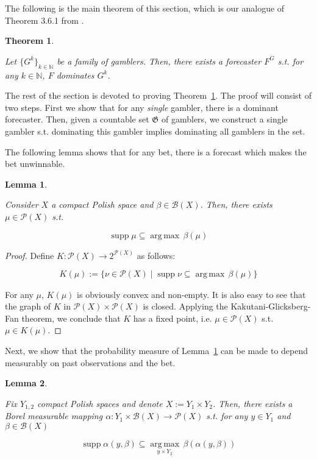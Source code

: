 \documentclass[11pt]{article}
\theoremstyle{definition}
\theoremstyle{plain}
\newtheorem{theorem}{Theorem}%
\newtheorem{lemma}{Lemma}%
\newcommand{\Nats}{\mathbb{N}}
\newcommand{\Argmax}[1]{\underset{#1}{\operatorname{arg\,max}}\,}
\newcommand{\Sq}[2]{\{#1\}_{#2 \in \Nats}}
\newcommand{\PM}{\mathcal{P}}
\DeclareMathOperator{\Sp}{supp}
\newcommand{\Gm}{\mathcal{B}}
\newcommand{\GC}{\mathfrak{G}}
\begin{document}
The following is the main theorem of this section, which is our analogue of Theorem 3.6.1 from \cite{Garrabrant_2016}.

\begin{theorem}
\label{thm:exist_dominant}

Let $\Sq{G^k}{k}$ be a family of gamblers. Then, there exists a forecaster $F^G$ s.t. for any $k \in \Nats$, $F$ dominates $G^k$.

\end{theorem}

The rest of the section is devoted to proving Theorem~\ref{thm:exist_dominant}. The proof will consist of two steps. First we show that for any \emph{single} gambler, there is a dominant forecaster. Then, given a countable set $\GC$ of gamblers, we construct a single gambler s.t. dominating this gambler implies dominating all gamblers in the set.

The following lemma shows that for any bet, there is a forecast which makes the bet unwinnable.

\begin{lemma}
\label{lmm:unwinnable}

Consider $X$ a compact Polish space and $\beta \in \Gm(X)$. Then, there exists $\mu \in \PM(X)$ s.t.

\begin{equation}
\Sp \mu \subseteq \Argmax{} \beta(\mu)
\end{equation}

\end{lemma}

\begin{proof}

Define ${K: \PM(X) \rightarrow 2^{\PM(X)}}$ as follows:

\[K(\mu):=\{\nu \in \PM(X) \mid \Sp{\nu} \subseteq \Argmax{}{\beta(\mu)}\}\]

For any ${\mu}$, ${K}(\mu)$ is obviously convex and non-empty. It is also easy to see that the graph of $K$ in $\PM(X) \times \PM(X)$ is closed. Applying the Kakutani-Glicksberg-Fan theorem, we conclude that $K$ has a fixed point, i.e. $\mu \in \PM(X)$ s.t. $\mu \in K(\mu)$.
\end{proof}

Next, we show that the probability measure of Lemma~\ref{lmm:unwinnable} can be made to depend measurably on past observations and the bet.

\begin{lemma}
\label{lmm:measurable_unwinnable}

Fix $Y_{1,2}$ compact Polish spaces and denote $X:=Y_1 \times Y_2$. Then, there exists a Borel measurable mapping $\alpha: Y_1 \times \Gm(X) \rightarrow \PM(X)$ s.t. for any $y \in Y_1$ and $\beta \in \Gm(X)$

\begin{equation}
\Sp \alpha(y,\beta) \subseteq \Argmax{y \times Y_2} \beta(\alpha(y,\beta))
\end{equation}

\end{lemma}
\end{document}
